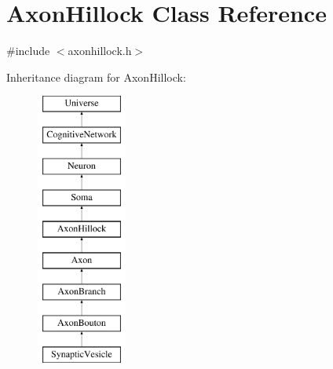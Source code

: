 \hypertarget{classAxonHillock}{}\section{Axon\+Hillock Class Reference}
\label{classAxonHillock}


{\ttfamily \#include $<$axonhillock.\+h$>$}

Inheritance diagram for Axon\+Hillock\+:\begin{figure}[H]
\begin{center}
\leavevmode
\includegraphics[height=9.000000cm]{classAxonHillock}
\end{center}
\end{figure}
